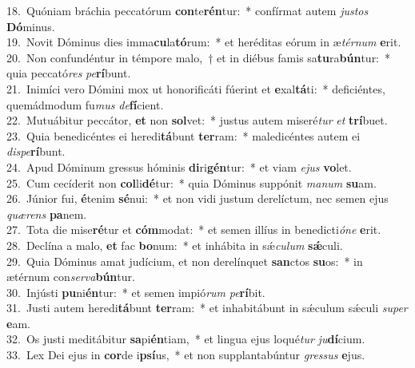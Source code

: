 {18.~}Quóniam bráchia peccatórum \textbf{con}te\textbf{rén}tur:~* confírmat autem \textit{ju}\textit{stos} \textbf{Dó}minus.\\
{19.~}Novit Dóminus dies imma\textbf{cu}la\textbf{tó}rum:~* et heréditas eórum in æ\textit{tér}\textit{num} \textbf{e}rit.\\
{20.~}Non confundéntur in témpore malo,~† et in diébus famis sa\textbf{tu}ra\textbf{bún}tur:~* quia peccató\textit{res} \textit{pe}\textbf{rí}bunt.\\
{21.~}Inimíci vero Dómini mox ut honorificáti fúerint et \textbf{e}xal\textbf{tá}ti:~* deficiéntes, quemádmodum fu\textit{mus} \textit{de}\textbf{fí}cient.\\
{22.~}Mutuábitur peccátor, \textbf{et} non \textbf{sol}vet:~* justus autem miseré\textit{tur} \textit{et} \textbf{trí}buet.\\
{23.~}Quia benedicéntes ei heredi\textbf{tá}bunt \textbf{ter}ram:~* maledicéntes autem ei \textit{di}\textit{spe}\textbf{rí}bunt.\\
{24.~}Apud Dóminum gressus hóminis \textbf{di}ri\textbf{gén}tur:~* et viam \textit{e}\textit{jus} \textbf{vo}let.\\
{25.~}Cum cecíderit non \textbf{col}li\textbf{dé}tur:~* quia Dóminus suppónit \textit{ma}\textit{num} \textbf{su}am.\\
{26.~}Júnior fui, \textbf{é}tenim \textbf{sé}nui:~* et non vidi justum derelíctum, nec semen ejus \textit{quæ}\textit{rens} \textbf{pa}nem.\\
{27.~}Tota die mise\textbf{ré}tur et \textbf{cóm}modat:~* et semen illíus in benedicti\textit{ó}\textit{ne} \textbf{e}rit.\\
{28.~}Declína a malo, \textbf{et} fac \textbf{bo}num:~* et inhábita in sǽ\textit{cu}\textit{lum} \textbf{sǽ}culi.\\
{29.~}Quia Dóminus amat judícium, et non derelínquet \textbf{san}ctos \textbf{su}os:~* in ætérnum con\textit{ser}\textit{va}\textbf{bún}tur.\\
{30.~}Injústi \textbf{pu}ni\textbf{én}tur:~* et semen impió\textit{rum} \textit{pe}\textbf{rí}bit.\\
{31.~}Justi autem heredi\textbf{tá}bunt \textbf{ter}ram:~* et inhabitábunt in sǽculum sǽculi \textit{su}\textit{per} \textbf{e}am.\\
{32.~}Os justi meditábitur \textbf{sa}pi\textbf{én}tiam,~* et lingua ejus loqué\textit{tur} \textit{ju}\textbf{dí}cium.\\
{33.~}Lex Dei ejus in \textbf{cor}de i\textbf{psí}us,~* et non supplantabúntur \textit{gres}\textit{sus} \textbf{e}jus.\\
